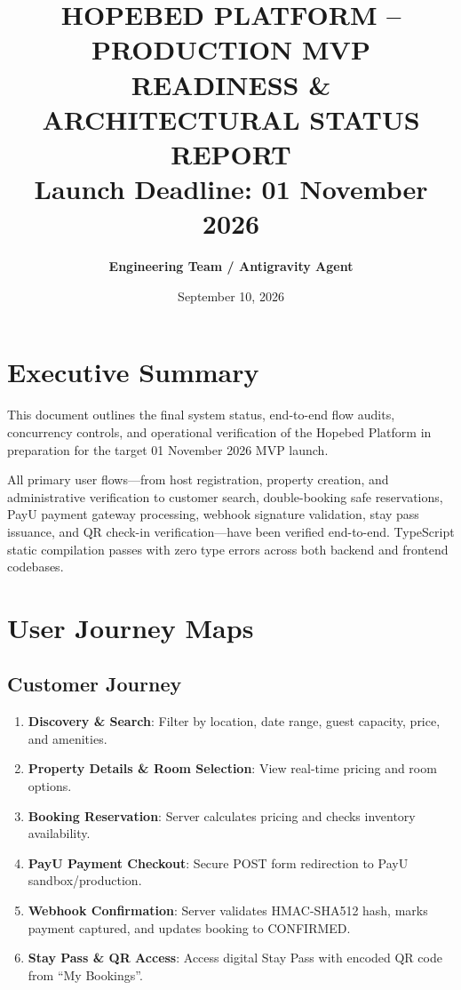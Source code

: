 \documentclass[11pt,a4paper]{article}
\title{\textbf{HOPEBED PLATFORM -- PRODUCTION MVP READINESS \& ARCHITECTURAL STATUS REPORT}\\[0.5em]
\large Launch Deadline: 01 November 2026}
\author{\textbf{Engineering Team / Antigravity Agent}}
\date{September 10, 2026}
\begin{document}
\maketitle

\tableofcontents
\newpage

\section{Executive Summary}
This document outlines the final system status, end-to-end flow audits, concurrency controls, and operational verification of the Hopebed Platform in preparation for the target 01 November 2026 MVP launch. 

All primary user flows---from host registration, property creation, and administrative verification to customer search, double-booking safe reservations, PayU payment gateway processing, webhook signature validation, stay pass issuance, and QR check-in verification---have been verified end-to-end. TypeScript static compilation passes with zero type errors across both backend and frontend codebases.

\section{User Journey Maps}

\subsection{Customer Journey}
\begin{enumerate}
    \item \textbf{Discovery \& Search}: Filter by location, date range, guest capacity, price, and amenities.
    \item \textbf{Property Details \& Room Selection}: View real-time pricing and room options.
    \item \textbf{Booking Reservation}: Server calculates pricing and checks inventory availability.
    \item \textbf{PayU Payment Checkout}: Secure POST form redirection to PayU sandbox/production.
    \item \textbf{Webhook Confirmation}: Server validates HMAC-SHA512 hash, marks payment captured, and updates booking to CONFIRMED.
    \item \textbf{Stay Pass \& QR Access}: Access digital Stay Pass with encoded QR code from ``My Bookings''.
\end{enumerate}
\end{document}
